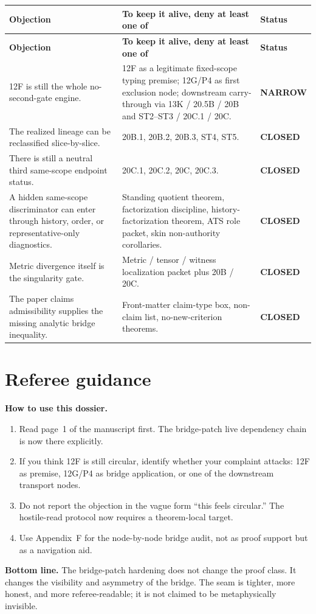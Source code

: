 \documentclass[11pt,letterpaper]{article}
\newcommand{\closed}{\textcolor{Good}{\textbf{CLOSED}}}
\newcommand{\narrow}{\textcolor{Warn}{\textbf{NARROW}}}
\begin{document}
\begin{longtable}{L{2.15in}L{2.35in}L{1.5in}}
\toprule
\textbf{Objection} & \textbf{To keep it alive, deny at least one of} & \textbf{Status}\\
\midrule
\endfirsthead
\toprule
\textbf{Objection} & \textbf{To keep it alive, deny at least one of} & \textbf{Status}\\
\midrule
\endhead
12F is still the whole no-second-gate engine. & 12F as a legitimate fixed-scope typing premise; 12G/P4 as first exclusion node; downstream carry-through via 13K / 20.5B / 20B and ST2--ST3 / 20C.1 / 20C. & \narrow\\
The realized lineage can be reclassified slice-by-slice. & 20B.1, 20B.2, 20B.3, ST4, ST5. & \closed\\
There is still a neutral third same-scope endpoint status. & 20C.1, 20C.2, 20C, 20C.3. & \closed\\
A hidden same-scope discriminator can enter through history, order, or representative-only diagnostics. & Standing quotient theorem, factorization discipline, history-factorization theorem, ATS role packet, skin non-authority corollaries. & \closed\\
Metric divergence itself is the singularity gate. & Metric / tensor / witness localization packet plus 20B / 20C. & \closed\\
The paper claims admissibility supplies the missing analytic bridge inequality. & Front-matter claim-type box, non-claim list, no-new-criterion theorems. & \closed\\
\bottomrule
\end{longtable}

\section{Referee guidance}

\begin{freezebox}
\textbf{How to use this dossier.}
\begin{enumerate}[label=(\arabic*),leftmargin=2.2em]
\item Read page~1 of the manuscript first. The bridge-patch live dependency chain is now there explicitly.
\item If you think 12F is still circular, identify whether your complaint attacks: 12F as premise, 12G/P4 as bridge application, or one of the downstream transport nodes.
\item Do not report the objection in the vague form ``this feels circular.'' The hostile-read protocol now requires a theorem-local target.
\item Use Appendix~F for the node-by-node bridge audit, not as proof support but as a navigation aid.
\end{enumerate}
\end{freezebox}

\begin{scopebox}
\textbf{Bottom line.} The bridge-patch hardening does not change the proof class. It changes the visibility and asymmetry of the bridge. The seam is tighter, more honest, and more referee-readable; it is not claimed to be metaphysically invisible.
\end{scopebox}
\end{document}
